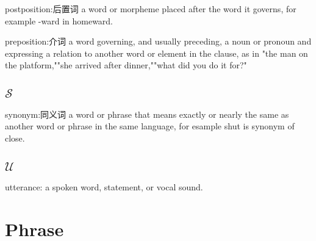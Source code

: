 \vbox{
\label{voc:postposition}
{\vocword postposition}:{\vocchineseword 后置词}\newline\smallskip
\bb
{\vocdef a word or morpheme placed after the word it governs, for example -ward in homeward.}\newline
{}
}

\vbox{
\label{voc:preposition}
{\vocword preposition}:{\vocchineseword 介词}\newline\smallskip
\bb
{\vocdef a word governing, and usually preceding, a noun or pronoun and expressing a%
relation to another word or element in the clause, as in "the man on the platform,""she arrived%
after dinner,""what did you do it for?"}\newline
{}
}


\subsection{$\mathcal{S}$}

\vbox{
\label{voc:synonym}
{\vocword synonym}:{\vocchineseword 同义词}\newline\smallskip
\bb
{\vocdef a word or phrase that means exactly or nearly the same as another%
word or phrase in the same language, for esample shut is synonym of close.}\newline
{}
}


\subsection{$\mathcal{U}$}

\vbox{
\label{voc:utterance}
{\vocword utterance}:\newline\smallskip
\bb
{\vocdef a spoken word, statement, or vocal sound.}\newline
{}\newline
{}
}



\section{Phrase}

